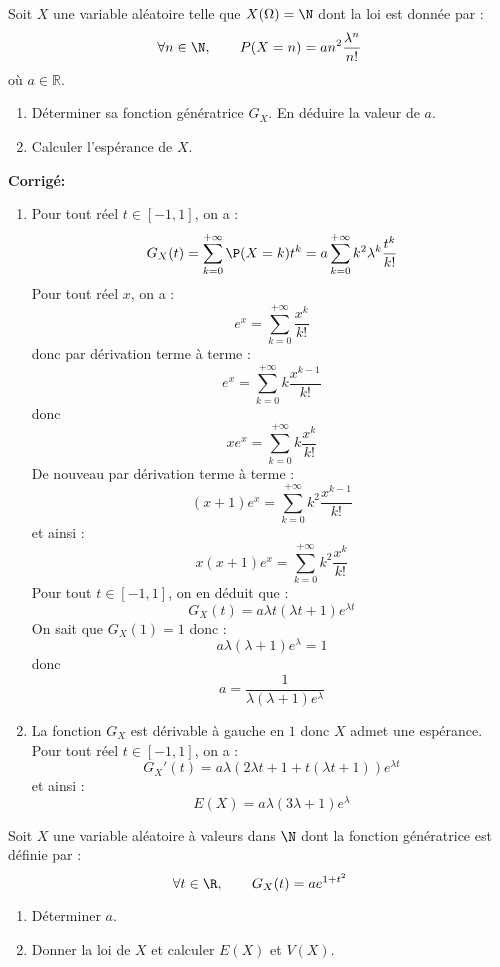 \documentclass[a4paper,twoside,french,11pt]{VcCours}
\newcommand{\corr}{\textbf{Corrigé:}}
\begin{document}
\begin{Exercice}{} Soit $X$ une variable aléatoire telle que $X(\Omega)=\N$ dont la loi est donnée par :
$$\forall n\in\N,\qquad P(X=n)=an^2\frac{\lambda^n}{n!}$$
où $a \in \mathbb{R}$.
\begin{enumerate}
	\item Déterminer sa fonction génératrice $G_X.$ En déduire la valeur de $a.$
	
	\item Calculer l'espérance de $X.$
\end{enumerate}
\end{Exercice}

\corr 

\begin{enumerate}
\item Pour tout réel $t \in [-1,1]$, on a :
$$ G_X(t) = \sum_{k=0}^{+ \infty} \P(X=k) t^k = a  \sum_{k=0}^{+ \infty} k^2 \lambda^k \dfrac{t^k}{k!} $$  
Pour tout réel $x$, on a :
$$ e^x = \sum_{k=0}^{+ \infty} \dfrac{x^k}{k!}$$
donc par dérivation terme à terme :
$$ e^x =  \sum_{k=0}^{+ \infty} k\dfrac{x^{k-1}}{k!}$$
donc
$$ x e^x =  \sum_{k=0}^{+ \infty} k\dfrac{x^{k}}{k!}$$
De nouveau par dérivation terme à terme :
$$ (x+1)e^x =  \sum_{k=0}^{+ \infty} k^2\dfrac{x^{k-1}}{k!}$$
et ainsi :
$$ x(x+1) e^x =  \sum_{k=0}^{+ \infty} k^2\dfrac{x^{k}}{k!}$$
Pour tout $t \in [-1,1]$, on en déduit que :
$$ G_X(t) = a \lambda t (\lambda t +1) e^{\lambda t}$$
On sait que $G_X(1)=1$ donc :
$$ a \lambda (\lambda + 1) e^{\lambda} = 1$$
donc
$$ a = \dfrac{1}{\lambda (\lambda+1) e^{\lambda}}$$
\item La fonction $G_X$ est dérivable à gauche en $1$ donc $X$ admet une espérance. Pour tout réel $t \in [-1,1]$, on a :
$$ G_X'(t) = a\lambda ( 2\lambda t+1 +  t (\lambda t + 1)) e^{\lambda t}$$
et ainsi :
$$ E(X) = a \lambda (3 \lambda +1 ) e^{\lambda}$$
\end{enumerate}


\begin{Exercice}{} Soit $X$ une variable aléatoire \`a valeurs dans $\N$ dont la fonction génératrice est définie par :
$$\forall t\in\R,\qquad G_X(t)=ae^{1+t^2}$$

\begin{enumerate}
	\item Déterminer $a.$
	
	\item Donner la loi de $X$ et calculer $E(X)$ et $V(X).$
	
\end{enumerate}
\end{Exercice}
\end{document}
